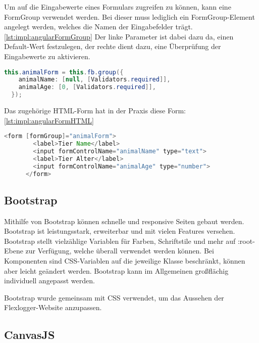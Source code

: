 Um auf die Eingabewerte eines Formulars zugreifen zu können, kann eine FormGroup verwendet werden. Bei dieser muss lediglich ein FormGroup-Element angelegt werden, welches die Namen der Eingabefelder trägt. \ref{lst:impl:angularFormGroup} Der linke Parameter ist dabei dazu da, einen Default-Wert festzulegen, der rechte dient dazu, eine Überprüfung der Eingabewerte zu aktivieren.
 
\begin{lstlisting}[language=java,caption=Beispiel für FormGroup eines Angular Formulars,label=lst:impl:angularFormGroup]
  this.animalForm = this.fb.group({
    animalName: [null, [Validators.required]],
    animalAge: [0, [Validators.required]],
  });
\end{lstlisting}
 
\newpage

Das zugehörige HTML-Form hat in der Praxis diese Form:  \ref{lst:impl:angularFormHTML}

\begin{lstlisting}[language=java,caption=Beispiel für ein reaktives Formular,label=lst:impl:angularFormHTML]
  <form [formGroup]="animalForm">
        <label>Tier Name</label>
        <input formControlName="animalName" type="text">
        <label>Tier Alter</label>
        <input formControlName="animalAge" type="number">
      </form>
\end{lstlisting}
\cite{angularHandbuchBuch}
 
 
\subsection{Bootstrap}
Mithilfe von Bootstrap können schnelle und responsive Seiten gebaut werden. Bootstrap ist leistungsstark, erweiterbar und mit vielen Features versehen. Bootstrap stellt vielzählige Variablen für Farben, Schriftstile und mehr auf :root-Ebene zur Verfügung, welche überall verwendet werden können. Bei Komponenten sind CSS-Variablen auf die jeweilige Klasse beschränkt, können aber leicht geändert werden. Bootstrap kann im Allgemeinen großflächig individuell angepasst werden.
\cite{bootstrap}

Bootstrap wurde gemeinsam mit CSS verwendet, um das Aussehen der Flexlogger-Website anzupassen.


\subsection{CanvasJS}
\label{subsection:canvasJS}
 
